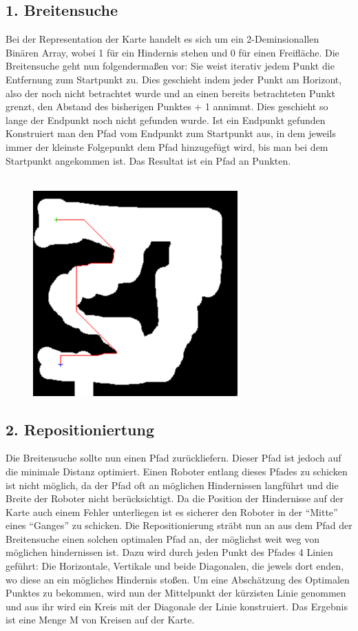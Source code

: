 \subsection*{1. Breitensuche}
	Bei der Representation der Karte handelt es sich um ein 2-Deminsionallen Binären Array, wobei 1 für ein Hindernis stehen und 0 für einen Freifläche. Die Breitensuche geht nun folgendermaßen vor: Sie weist iterativ jedem Punkt die Entfernung zum Startpunkt zu. Dies geschieht indem jeder Punkt am Horizont, also der noch nicht betrachtet wurde und an einen bereits betrachteten Punkt grenzt, den Abstand des bisherigen Punktes + 1 annimmt. Dies geschieht so lange der Endpunkt noch nicht gefunden wurde. Ist ein Endpunkt gefunden Konstruiert man den Pfad vom Endpunkt zum Startpunkt aus, in dem jeweils immer der kleinste Folgepunkt dem Pfad hinzugefügt wird, bis man bei dem Startpunkt angekommen ist. Das Resultat ist ein Pfad an Punkten.\\
	\\

\begin{figure}[ht]
    \centering
	\includegraphics[width=0.7\textwidth, angle=0]{img/p2.png} 
\end{figure}
\subsection*{2. Repositioniertung}
	Die Breitensuche sollte nun einen Pfad zurückliefern. Dieser Pfad ist jedoch auf die minimale Distanz optimiert. Einen Roboter entlang dieses Pfades zu schicken ist nicht möglich, da der Pfad oft an möglichen Hindernissen langführt und die Breite der Roboter nicht berücksichtigt. Da die Position der Hindernisse auf der Karte auch einem Fehler unterliegen ist es sicherer den Roboter in der ``Mitte'' eines ``Ganges'' zu schicken. Die Repositionierung sträbt nun an aus dem Pfad der Breitensuche einen solchen optimalen Pfad an, der möglichst weit weg von möglichen hindernissen ist. Dazu wird durch jeden Punkt des Pfades 4 Linien geführt: Die Horizontale, Vertikale und beide Diagonalen, die jewels dort enden, wo diese an ein mögliches Hindernis stoßen. Um eine Abschätzung des Optimalen Punktes zu bekommen, wird nun der Mittelpunkt der kürzisten Linie genommen und aus ihr wird ein Kreis mit der Diagonale der Linie konstruiert. Das Ergebnis ist eine Menge M von Kreisen auf der Karte. \\


